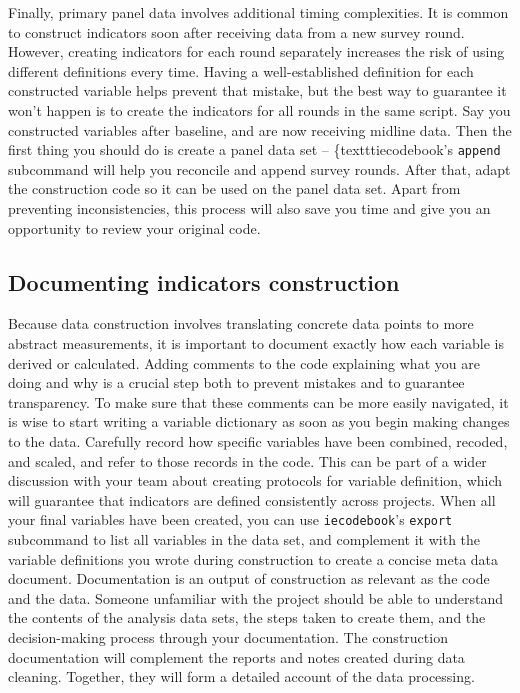 Finally, primary panel data involves additional timing complexities.
It is common to construct indicators soon after receiving data from a new survey round.
However, creating indicators for each round separately increases the risk of using different definitions every time.
Having a well-established definition for each constructed variable helps prevent that mistake,
but the best way to guarantee it won't happen is to create the indicators for all rounds in the same script.
Say you constructed variables after baseline, and are now receiving midline data.
Then the first thing you should do is create a panel data set
-- \{texttt{iecodebook}'s \texttt{append} subcommand will help you reconcile and append survey rounds.
After that, adapt the construction code so it can be used on the panel data set.
Apart from preventing inconsistencies, this process will also save you time and give you an opportunity to review your original code.

\subsection{Documenting indicators construction}

Because data construction involves translating concrete data points to more abstract measurements, it is important to document exactly how each variable is derived or calculated.
Adding comments to the code explaining what you are doing and why is a crucial step both to prevent mistakes and to guarantee transparency.
To make sure that these comments can be more easily navigated, it is wise to start writing a variable dictionary as soon as you begin making changes to the data.
Carefully record how specific variables have been combined, recoded, and scaled,  and refer to those records in the code. 
This can be part of a wider discussion with your team about creating protocols for variable definition, which will guarantee that indicators are defined consistently across projects.
When all your final variables have been created, you can use \texttt{iecodebook}'s \texttt{export} subcommand to list all variables in the data set, 
and complement it with the variable definitions you wrote during construction to create a concise meta data document.
Documentation is an output of construction as relevant as the code and the data.
Someone unfamiliar with the project should be able to understand the contents of the analysis data sets, the steps taken to create them, and the decision-making process through your documentation.
The construction documentation will complement the reports and notes created during data cleaning.
Together, they will form a detailed account of the data processing.

